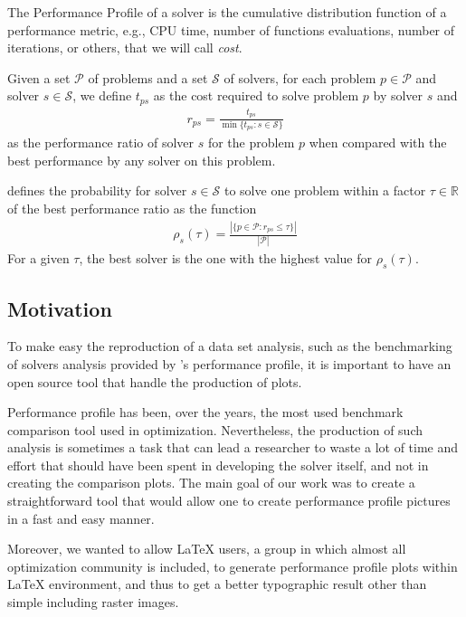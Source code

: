 \documentclass[10pt,a4paper]{article}
\def\Pset{\mathcal{P}}
\def\Sset{\mathcal{S}}
\begin{document}
The Performance Profile of a solver is the cumulative distribution
    function of a performance metric, e.g., CPU time, number of functions
    evaluations, number of iterations, or others, that we will call \emph{cost}.

    Given a set $\Pset$ of problems and a set $\Sset$ of solvers, for each problem $p
    \in \Pset$ and solver $s \in \Sset$, we define $t_{ps}$ as the cost
    required to solve problem $p$ by solver $s$ and
    \begin{align*}
      r_{ps} = \frac{t_{ps}}{\min\{t_{ps}: s \in \Sset\}}
    \end{align*}
    as the performance ratio of solver $s$ for the problem $p$ when compared
    with the best performance by any solver on this problem.

    \textcite{Dolan:2002du} defines the probability for solver $s \in \Sset$ to solve one
    problem within a factor $\tau \in \mathds{R}$ of the best performance
    ratio as the function
    \begin{align*}
      \rho_s(\tau) = \frac{| \{p \in \Pset: r_{ps} \leq \tau\} |}{| \Pset |}
    \end{align*}
     For a given $\tau$, the best solver is the one with the highest
    value for $\rho_s(\tau)$.

    \subsection*{Motivation}
    To make easy the reproduction of  a data set analysis, such as the  benchmarking of
    solvers analysis provided by \citeauthor{Dolan:2002du}'s performance profile, it is important to have an open source tool that handle the production of plots.


    Performance profile has been, over the years, the most used benchmark comparison tool used in optimization. Nevertheless, the production of such analysis is sometimes a task that can lead a researcher to waste a lot of time and effort that should have been spent in developing the solver itself, and not in creating the comparison plots. The main goal of our work was to create  a straightforward  tool that would allow one to create performance profile pictures in a fast and easy manner.

    Moreover,  we wanted to allow LaTeX users, a group in which almost all optimization community is included,  to   generate performance profile plots  within LaTeX environment, and thus to get a better typographic result other than simple including raster  images.
\end{document}
